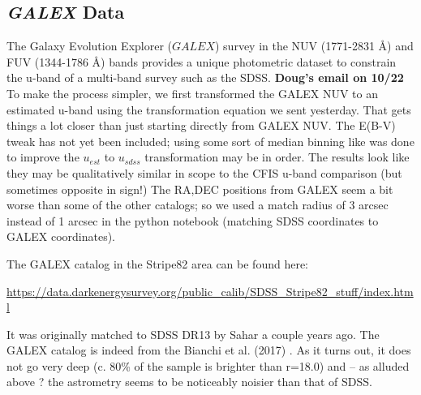 \documentclass{aastex63}
\begin{document}
 



        

\subsection{{\it GALEX} Data} \label{ssec:galex}

The Galaxy Evolution Explorer ($GALEX$) survey in the NUV (1771-2831 \AA) and FUV (1344-1786 \AA) bands provides a unique photometric dataset to constrain the u-band of a multi-band survey such as the SDSS.   
\citep{2017ApJS..230...24B}
{\bf Doug's email on 10/22} To make the process simpler, we first transformed the GALEX NUV to an estimated u-band using the transformation equation we sent yesterday.  That gets things a lot closer than just starting directly from GALEX NUV.  The E(B-V) tweak has not yet been included; using some sort of median binning like was done to improve the $u_{est}$ to $u_{sdss}$ transformation may be in order.  The results look like they may be qualitatively similar in scope to the CFIS u-band comparison (but sometimes opposite in sign!)  The RA,DEC positions from GALEX seem a bit worse than some of the other catalogs; so we used a match radius of 3 arcsec instead of 1 arcsec in the python notebook (matching SDSS coordinates to GALEX coordinates).
 
The GALEX catalog in the Stripe82 area can be found here:

\url{https://data.darkenergysurvey.org/public_calib/SDSS_Stripe82_stuff/index.html}

It was originally matched to SDSS DR13 by Sahar a couple years ago.  The GALEX catalog is indeed from the Bianchi et al. (2017) \citep{2017ApJS..230...24B}.  As it turns out, it does not go very deep (c. 80\% of the sample is brighter than r=18.0) and  -- as alluded above ? the astrometry seems to be noticeably noisier than that of SDSS.
 
\end{document}
